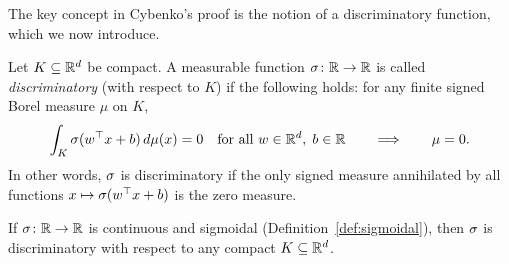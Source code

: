 \documentclass[11pt,a4paper]{article}
\begin{document}
The key concept in Cybenko's proof is the notion of a discriminatory
function, which we now introduce.

\begin{definition}
\label{def:discriminatory}
Let $K \subseteq \mathbb{R}^d$ be compact.  A measurable function $\sigma
\colon \mathbb{R} \to \mathbb{R}$ is called \emph{discriminatory} (with respect to $K$)
if the following holds: for any finite signed Borel measure $\mu$ on $K$,
\[
  \int_K \sigma(w^\top x + b) \, d\mu(x) = 0
  \quad \text{for all } w \in \mathbb{R}^d, \; b \in \mathbb{R}
  \qquad \Longrightarrow \qquad
  \mu = 0.
\]
In other words, $\sigma$ is discriminatory if the only signed measure
annihilated by all functions $x \mapsto \sigma(w^\top x + b)$ is the
zero measure.
\end{definition}

\begin{lemma}
\label{lem:sig-disc}
If $\sigma \colon \mathbb{R} \to \mathbb{R}$ is continuous and sigmoidal
(Definition~\ref{def:sigmoidal}), then $\sigma$ is discriminatory with
respect to any compact $K \subseteq \mathbb{R}^d$.
\end{lemma}
\end{document}
